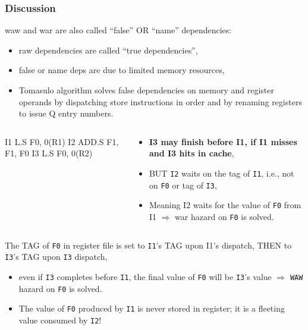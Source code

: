 \documentclass{beamer}
\newcommand{\emp}[1]{\textcolor{DikuRed}{ #1}}
\newcommand{\emphh}[1]{\textcolor{CosGreen}{ #1}}
\begin{document}
\begin{frame}[fragile,t]
\frametitle{Discussion}

{\sc waw} and {\sc war} are also called ``false'' OR ``name'' dependencies:
\begin{itemize}
    \item {\sc raw} dependencies are called ``true dependencies'',
    \item false or name deps are due to limited memory resources,
    \item Tomasulo algorithm solves false dependencies 
            on memory and register operands by dispatching
            store instructions in order and 
            by renaming registers to issue Q entry numbers.
\end  {itemize}
\medskip

\begin{columns}
\begin{colorcode}[fontsize=\scriptsize]
I1   L.S   F0,  0(R1)
I2   ADD.S F1, F1, F0
I3   L.S   F0,  0(R2)
\end{colorcode} 
\begin{scriptsize}
\begin{itemize}
    \item \emp{\bf I3 may finish before I1, if I1 misses and I3 hits in cache},\pause
    \item \emphh{BUT {\tt I2} waits on the tag of {\tt I1}, 
            i.e., not on {\tt F0} or tag of {\tt I3},}
    \item Meaning I2 waits for the value of {\tt F0} from I1 $\Rightarrow$
            {\sc war} hazard on {\tt F0} is solved.
\end{itemize}
\end{scriptsize}
\end{columns}
\bigskip

The TAG of {\tt F0} in register file is set to {\tt I1}'s TAG upon I1's dispatch, 
THEN to {\tt I3}'s TAG upon {\tt I3}  dispatch,
\begin{itemize}
    \item \emphh{even if {\tt I3} completes before {\tt I1}, the final
            value of {\tt F0} will be {\tt I3}'s value $\Rightarrow$ {\tt WAW}
            hazard on {\tt F0} is solved.} 
    \item \emphh{The value of {\tt F0} produced by {\tt I1} is never stored in register;
            it is a fleeting value consumed by {\tt I2}!}
\end  {itemize}
\end{frame}
\end{document}
